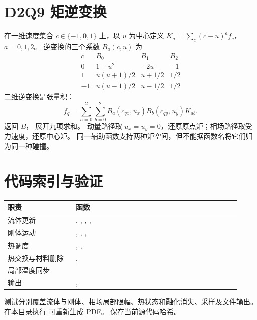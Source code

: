 \section{D2Q9 矩逆变换}
\label{app:inverse}
在一维速度集合 $c\in\{-1,0,1\}$ 上，以 $u$ 为中心定义
$K_a=\sum_c(c-u)^a f_c$，$a=0,1,2$。
逆变换的三个系数 $B_a(c,u)$ 为
\begin{equation}
\begin{array}{c|ccc}
 c&B_0&B_1&B_2\\\hline
 0&1-u^2&-2u&-1\\
 1&u(u+1)/2&u+1/2&1/2\\
 -1&u(u-1)/2&u-1/2&1/2
\end{array}
\end{equation}
二维逆变换是张量积：
\begin{equation}
 f_q=\sum_{a=0}^2\sum_{b=0}^2
 B_a(c_{qx},u_x)B_b(c_{qy},u_y)K_{ab}.
\end{equation}
 返回 $B$，
 展开九项求和。
动量路径取 $u_x=u_y=0$，还原原点矩；相场路径取受力速度，还原中心矩。
同一辅助函数支持两种矩空间，但不能据函数名将它们归为同一种碰撞。

\section{代码索引与验证}
\begin{longtable}{L{0.27\linewidth}L{0.65\linewidth}}
\toprule
职责 & 函数\\\midrule
流体更新 & , , , , \\
刚体运动 & , , , \\
热调度 & , , \\
热交换与材料删除 & , \\
局部温度同步 & \\
输出 & , \\
\bottomrule
\end{longtable}
测试分别覆盖流体与刚体、相场局部限幅、热状态和融化消失、采样及文件输出。
在本目录执行  可重新生成 PDF。
 保存当前源代码哈希。

